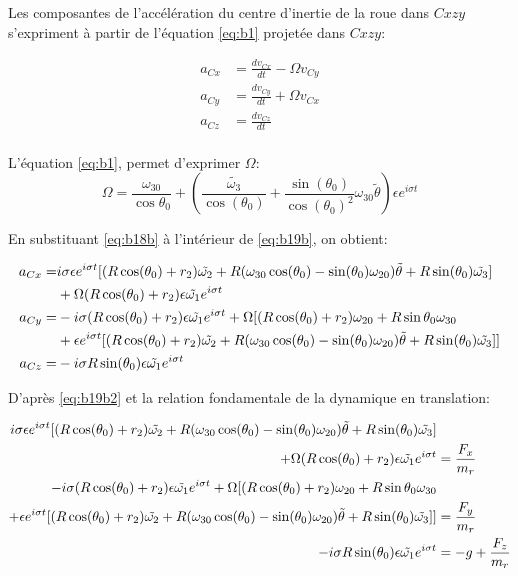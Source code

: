 Les composantes de l'accélération du centre d'inertie de la roue dans $C{xzy}$ s'expriment à partir de l'équation \ref{eq:b1} projetée dans $C{xzy}$:

\begin{align}
    a_{Cx}&=\frac{dv_{Cx}}{dt}-\Omega v_{Cy} \nonumber\\
    a_{Cy}&=\frac{dv_{Cy}}{dt} + \Omega v_{Cx}\nonumber\\
    a_{Cz}&=\frac{dv_{Cz}}{dt} 
  \label{eq:b19b}
\end{align}
\\
L'équation \ref{eq:b1}, permet d'exprimer $\Omega$:
\begin{equation}
    \Omega=\frac{\omega_{30}}{\cos{\theta_0}} + (\frac{\tilde{\omega_3}}{\cos(\theta_0)}+\frac{\sin(\theta_0)}{\cos(\theta_0)^2}\omega_{30}\tilde{\theta})\epsilon e^{i \sigma t}
    \label{eq:Omega}
\end{equation}


En substituant \ref{eq:b18b} à l'intérieur de \ref{eq:b19b}, on obtient:

\begin{align}
    a_{Cx}=& i \sigma \epsilon e^{i \sigma t}[(R\cos(\theta_0)+r_2) \Tilde{\omega_2} +R(\omega_{30}\cos(\theta_0)-\sin(\theta_0)\omega_{20}) \Tilde{\theta}+R\sin(\theta_0) \Tilde{\omega_3} ] \nonumber\\
    &+\Omega (R\cos(\theta_0)+r_2)\epsilon \Tilde{\omega_1} e^{i \sigma t} \nonumber\\
    a_{Cy}=& -i \sigma( R\cos(\theta_0)+r_2)\epsilon \Tilde{\omega_1} e^{i \sigma t} 
    + \Omega [(R\cos(\theta_0)+r_2)\omega_{20}+R \sin{\theta_0}\omega_{30} \nonumber\\ 
    &+ \epsilon e^{i \sigma t}[(R\cos(\theta_0)+r_2) \Tilde{\omega_2} +R(\omega_{30}\cos(\theta_0)-\sin(\theta_0)\omega_{20}) \Tilde{\theta}+R\sin(\theta_0) \Tilde{\omega_3} ] ]\nonumber \\
    a_{Cz}=& -i \sigma R \sin(\theta_0)\epsilon \Tilde{\omega_1} e^{i \sigma t} 
  \label{eq:b19b2}
\end{align}

D'après \ref{eq:b19b2} et la relation fondamentale de la dynamique en translation:

\begin{align}
  i \sigma \epsilon e^{i \sigma t}[(R\cos(\theta_0)+r_2) \Tilde{\omega_2} +R(\omega_{30}\cos(\theta_0)-\sin(\theta_0)\omega_{20}) \Tilde{\theta}+R\sin(\theta_0) \Tilde{\omega_3} ]& \nonumber \\
    +\Omega (R\cos(\theta_0)+r_2)\epsilon \Tilde{\omega_1} e^{i \sigma t}&=\frac{F_x}{m_r} \nonumber \\
    -i \sigma( R\cos(\theta_0)+r_2)\epsilon \Tilde{\omega_1} e^{i \sigma t}
    + \Omega [(R\cos(\theta_0)+r_2)\omega_{20}+R \sin{\theta_0}\omega_{30}& \nonumber\\ 
    + \epsilon e^{i \sigma t}[(R\cos(\theta_0)+r_2) \Tilde{\omega_2} +R(\omega_{30}\cos(\theta_0)-\sin(\theta_0)\omega_{20}) \Tilde{\theta}+R\sin(\theta_0) \Tilde{\omega_3} ] ]&=\frac{F_y}{m_r} \nonumber \\
    -i \sigma R \sin(\theta_0)\epsilon \Tilde{\omega_1} e^{i \sigma t}&=- g +\frac{F_z}{m_r}
  \label{eq:b20}
\end{align}

